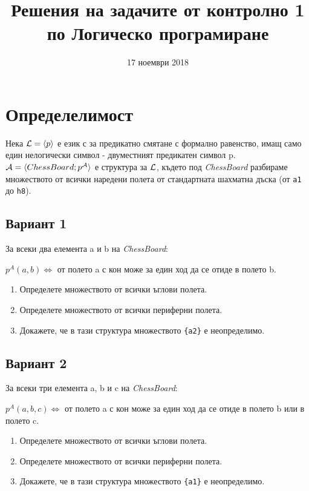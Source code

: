 \documentclass{article}
\title{Решения на задачите от контролно 1 по Логическо програмиране}
\date{17 ноември 2018}
\begin{document}
\maketitle

\section{Определелимост}
Нека ${\cal L}=\langle p\rangle$ е език с за предикатно смятане с формално равенство, имащ само един нелогически символ - двуместният предикатен символ p.\\ ${\cal{A}}=\langle ChessBoard; p^{\cal{A}}\rangle$ е структура за ${\cal L}$, където под \textit{ChessBoard} разбираме множеството от всички наредени полета от стандартната шахматна дъска (от \texttt{a1} до \texttt{h8}).  

\subsection{Вариант 1}
За всеки два елемента a и b на \textit{ChessBoard}:
\begin{center}
$p^A(a, b) \iff$ от полето a с кон може за един ход да се отиде в полето b.
\end{center}

\begin{enumerate}[label=(\roman*)]
\item Определете множеството от всички ъглови полета.
\item Определете множеството от всички периферни полета.
\item Докажете, че  в тази структура множеството \texttt{\{a2\}} е неопределимо.
\end{enumerate}

\subsection{Вариант 2}
За всеки три елемента a, b и c на \textit{ChessBoard}:
\begin{center}
$p^A(a, b, c) \iff$ от полето a с кон може за един ход да се отиде в полето b или в полето c.
\end{center}

\begin{enumerate}[label=(\roman*)]
\item Определете множеството от всички ъглови полета.
\item Определете множеството от всички периферни полета.
\item Докажете, че  в тази структура множеството \texttt{\{a1\}} е неопределимо.
\end{enumerate}
\end{document}
